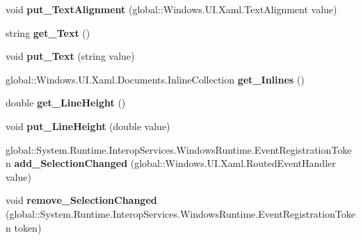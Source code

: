 \begin{DoxyCompactItemize}
void {\bfseries put\+\_\+\+Text\+Alignment} (global\+::\+Windows.\+U\+I.\+Xaml.\+Text\+Alignment value)
\item 
\mbox{\label{interface_windows_1_1_u_i_1_1_xaml_1_1_controls_1_1_i_text_block_a582d57058231ec6b50d2a938c3a978bc}} 
string {\bfseries get\+\_\+\+Text} ()
\item 
\mbox{\label{interface_windows_1_1_u_i_1_1_xaml_1_1_controls_1_1_i_text_block_a533b263e3487949e055f809bb25ece2f}} 
void {\bfseries put\+\_\+\+Text} (string value)
\item 
\mbox{\label{interface_windows_1_1_u_i_1_1_xaml_1_1_controls_1_1_i_text_block_a7234cc32a3da58efce8a882b5d2f996e}} 
global\+::\+Windows.\+U\+I.\+Xaml.\+Documents.\+Inline\+Collection {\bfseries get\+\_\+\+Inlines} ()
\item 
\mbox{\label{interface_windows_1_1_u_i_1_1_xaml_1_1_controls_1_1_i_text_block_a29846e44fd22f40af0b4b7d83f9e298d}} 
double {\bfseries get\+\_\+\+Line\+Height} ()
\item 
\mbox{\label{interface_windows_1_1_u_i_1_1_xaml_1_1_controls_1_1_i_text_block_a303a08f111a62df9e5b76472112e914c}} 
void {\bfseries put\+\_\+\+Line\+Height} (double value)
\item 
\mbox{\label{interface_windows_1_1_u_i_1_1_xaml_1_1_controls_1_1_i_text_block_af727476045815cf9cc9cf515d6d80a24}} 
global\+::\+System.\+Runtime.\+Interop\+Services.\+Windows\+Runtime.\+Event\+Registration\+Token {\bfseries add\+\_\+\+Selection\+Changed} (global\+::\+Windows.\+U\+I.\+Xaml.\+Routed\+Event\+Handler value)
\item 
\mbox{\label{interface_windows_1_1_u_i_1_1_xaml_1_1_controls_1_1_i_text_block_aa5f21aa6c1bfe8efdedfd5dbd95e003a}} 
void {\bfseries remove\+\_\+\+Selection\+Changed} (global\+::\+System.\+Runtime.\+Interop\+Services.\+Windows\+Runtime.\+Event\+Registration\+Token token)

\end{DoxyCompactItemize}
